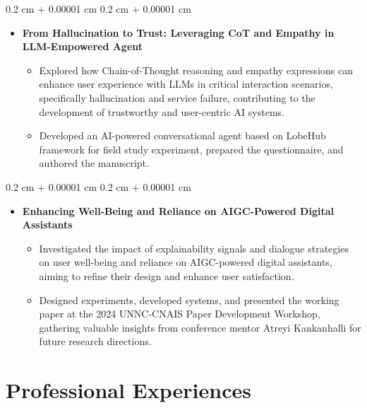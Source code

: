 \documentclass[10pt, letterpaper]{article}
\newenvironment{highlights}{
    \begin{itemize}[
        topsep=0.10 cm,
        parsep=0.10 cm,
        partopsep=0pt,
        itemsep=0pt,
        leftmargin=0.4 cm + 10pt
    ]
}{
    \end{itemize}
} %
\newenvironment{onecolentry}{
    \begin{adjustwidth}{
        0.2 cm + 0.00001 cm
    }{
        0.2 cm + 0.00001 cm
    }
}{
    \end{adjustwidth}
} %
\begin{document}
        \vspace{0.10 cm}
        \begin{onecolentry}
            \begin{highlights}
                \item \textbf{From Hallucination to Trust: Leveraging CoT and Empathy in LLM-Empowered Agent}
                \begin{itemize}
                    \item Explored how Chain-of-Thought reasoning and empathy expressions can enhance user experience with LLMs in critical interaction scenarios, specifically hallucination and service failure, contributing to the development of trustworthy and user-centric AI systems.
                    \item Developed an AI-powered conversational agent based on LobeHub framework for field study experiment, prepared the questionnaire, and authored the manuscript.
                \end{itemize}
            \end{highlights}
        \end{onecolentry}

        \vspace{0.10 cm}
        \begin{onecolentry}
            \begin{highlights}
                \item \textbf{Enhancing Well-Being and Reliance on AIGC-Powered Digital Assistants}
                \begin{itemize}
                    \item Investigated the impact of explainability signals and dialogue strategies on user well-being and reliance on AIGC-powered digital assistants, aiming to refine their design and enhance user satisfaction.
                    \item Designed experiments, developed systems, and presented the working paper at the 2024 UNNC-CNAIS Paper Development Workshop, gathering valuable insights from conference mentor Atreyi Kankanhalli for future research directions.
                \end{itemize}
            \end{highlights}
        \end{onecolentry}

    \section{Professional Experiences}
\end{document}
